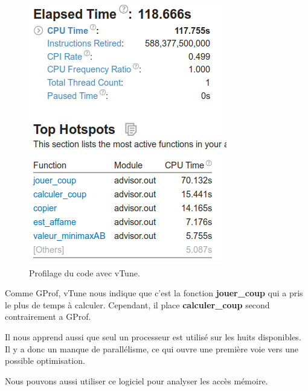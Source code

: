 \documentclass[
 aip,
 jmp,
 amsmath,amssymb,
 reprint
]{revtex4-1}
\begin{document}
\begin{figure}[H]
  \includegraphics[width=\linewidth, keepaspectratio=true]{vtune.png}
  \caption{Profilage du code avec vTune.\label{Fig:vTune_sequentiel_cpu}}
\end{figure}

Comme GProf, vTune nous indique que c'est la fonction \textbf{jouer\_coup} qui a pris le plus de temps à calculer. Cependant, il place \textbf{calculer\_coup} second contrairement a GProf.\par
Il nous apprend aussi que seul un processeur est utilisé sur les huits disponibles. Il y a donc un manque de parallélisme, ce qui ouvre une première voie vers une possible optimisation.\par
Nous pouvons aussi utiliser ce logiciel pour analyser les accès mémoire.
\end{document}
